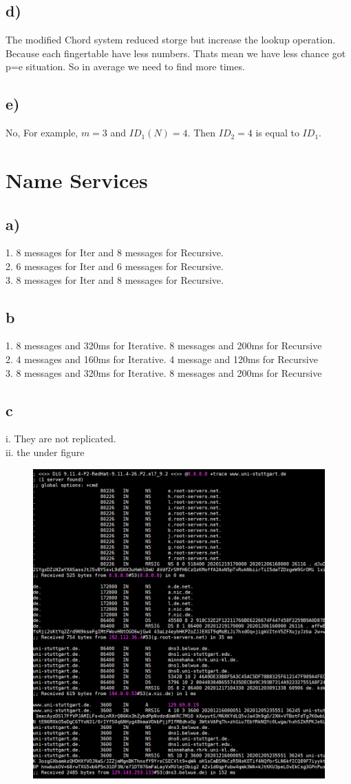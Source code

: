 \documentclass{article}
\begin{document}
\subsection*{d)}
The modified Chord system reduced storge but increase the lookup operation.
\\ Because each fingertable have less numbers. Thats mean we have less chance got p=e situation. So in average we need to find more times.

\subsection*{e)}
No, For example, $m=3$ and $ID_1(N)=4$. Then $ID_2=4$ is equal to $ID_1$.

\section{Name Services}
\subsection*{a)}
    1. 8 messages for Iter and 8 messages for Recursive.\\
    2. 6 messages for Iter and 6 messages for Recursive.\\
    3. 8 messages for Iter and 8 messages for Recursive.
\subsection*{b}
    1. 8 messages and 320ms for Iterative. 8 messages and 200ms for Recursive\\
    2. 4 messages and 160ms for Iterative. 4 message and 120ms for Recursive\\
    3. 8 messages and 320ms for Iterative. 8 messages and 200ms for Recursive
\subsection*{c}
i. They are not replicated.\\
ii. the under figure
\begin{figure}
    \includegraphics[scale=0.5]{dns.png}
\end{figure}
\end{document}
